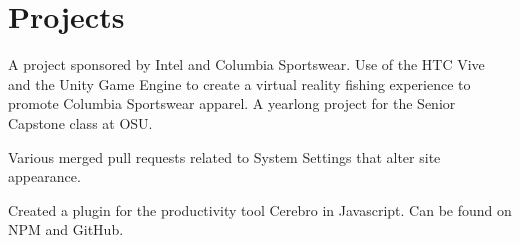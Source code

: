 \documentclass[]{hieudo-build}
\begin{document}
\begin{minipage}[t]{0.69\textwidth}
\sectionsep





\end{minipage} 

\section{Projects}
\descript{}
\vspace{5pt}
A project sponsored by Intel and Columbia Sportswear. Use of the HTC Vive and the Unity Game Engine to create a virtual reality fishing experience to promote Columbia Sportswear apparel. A yearlong project for the Senior Capstone class at OSU.
\sectionsep

\vspace{5pt}

Various merged pull requests related to System Settings that alter site appearance.

\vspace{5pt}

Created a plugin for the productivity tool Cerebro
in Javascript. Can be found on NPM and GitHub.
\end{document}
